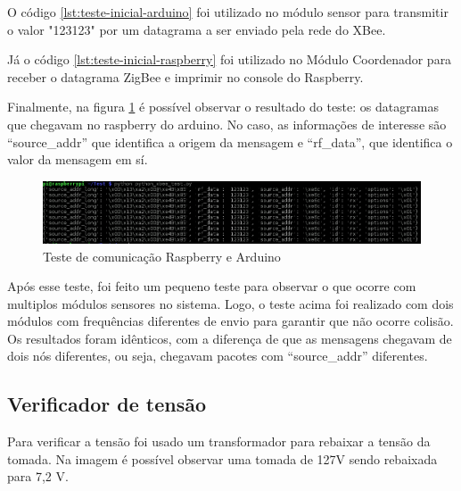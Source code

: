  O código \ref{lst:teste-inicial-arduino} foi utilizado no módulo sensor para transmitir o valor "123123" por um datagrama a ser enviado pela rede do XBee.



 Já o código \ref{lst:teste-inicial-raspberry} foi utilizado no Módulo Coordenador para receber o datagrama ZigBee e imprimir no console do Raspberry.



Finalmente, na figura \ref{fig:raspberry-arduino-1} é possível observar o resultado do teste: os datagramas que chegavam no raspberry do arduino. No caso, as informações de interesse são ``source\_addr'' que identifica a origem da mensagem e ``rf\_data'', que identifica o valor da mensagem em sí.

\begin{figure}[H]
\centering
\includegraphics[width=1\textwidth]{figuras/teste-inicial-raspberry-arduino.png}
\caption{\label{fig:raspberry-arduino-1} Teste de comunicação Raspberry e Arduino}
\end{figure}

Após esse teste, foi feito um pequeno teste para observar o que ocorre com multiplos módulos sensores no sistema. Logo, o teste acima foi realizado com dois módulos com frequências diferentes de envio para garantir que não ocorre colisão. Os resultados foram idênticos, com a diferença de que as mensagens chegavam de dois nós diferentes, ou seja, chegavam pacotes com ``source\_addr'' diferentes.

\subsection{Verificador de tensão}

Para verificar a tensão foi usado um transformador para rebaixar a tensão da tomada. Na imagem é possível observar uma tomada de 127V sendo rebaixada para 7,2 V.

